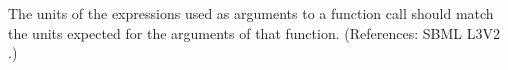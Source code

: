 The units of the expressions used as arguments to a function call
should match the units expected for the arguments of that function.
(References: SBML L3V2 .)
